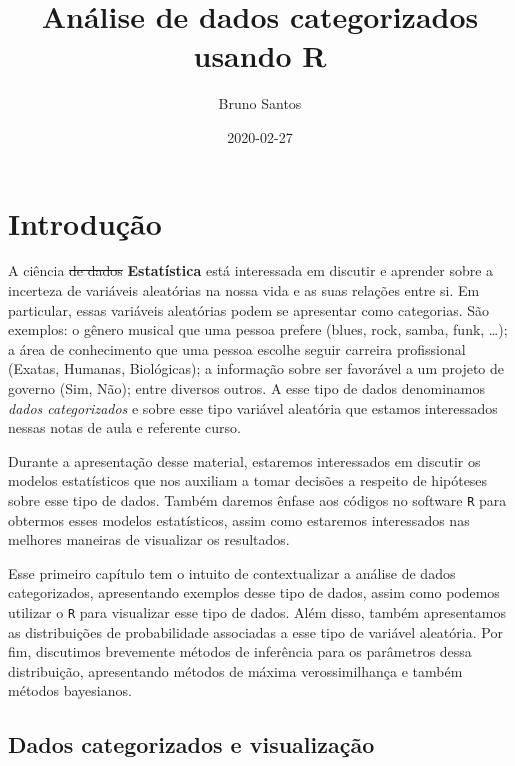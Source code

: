 \documentclass[]{book}
\title{Análise de dados categorizados usando R}
\author{Bruno Santos}
\date{2020-02-27}
\begin{document}
\maketitle

{
\setcounter{tocdepth}{1}
\tableofcontents
}
\hypertarget{introducao}{%
\chapter{Introdução}\label{introducao}}

A ciência \sout{de dados} \textbf{Estatística} está interessada em discutir e aprender sobre a incerteza de variáveis aleatórias na nossa vida e as suas relações entre si. Em particular, essas variáveis aleatórias podem se apresentar como categorias. São exemplos: o gênero musical que uma pessoa prefere (blues, rock, samba, funk, \ldots{}); a área de conhecimento que uma pessoa escolhe seguir carreira profissional (Exatas, Humanas, Biológicas); a informação sobre ser favorável a um projeto de governo (Sim, Não); entre diversos outros. A esse tipo de dados denominamos \emph{dados categorizados} e sobre esse tipo variável aleatória que estamos interessados nessas notas de aula e referente curso.

Durante a apresentação desse material, estaremos interessados em discutir os modelos estatísticos que nos auxiliam a tomar decisões a respeito de hipóteses sobre esse tipo de dados. Também daremos ênfase aos códigos no software \texttt{R} para obtermos esses modelos estatísticos, assim como estaremos interessados nas melhores maneiras de visualizar os resultados.

Esse primeiro capítulo tem o intuito de contextualizar a análise de dados categorizados, apresentando exemplos desse tipo de dados, assim como podemos utilizar o \texttt{R} para visualizar esse tipo de dados. Além disso, também apresentamos as distribuições de probabilidade associadas a esse tipo de variável aleatória. Por fim, discutimos brevemente métodos de inferência para os parâmetros dessa distribuição, apresentando métodos de máxima verossimilhança e também métodos bayesianos.

\hypertarget{dados-categorizados-e-visualizacao}{%
\section{Dados categorizados e visualização}\label{dados-categorizados-e-visualizacao}}
\end{document}
